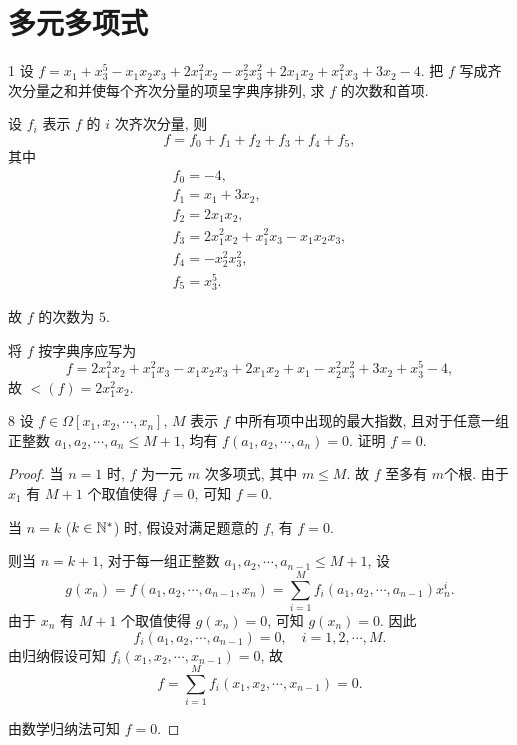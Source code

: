 
\renewcommand{\thesection}{1.9}

\section{多元多项式}\label{sec:1.9}

\begin{ex}{1}\label{ex:1.9.1}
    设 \(f=x_1+x_3^5-x_1x_2x_3+2x_1^2x_2-x_2^2x_3^2+2x_1x_2+x_1^2x_3+3x_2-4\).
    把 \(f\) 写成齐次分量之和并使每个齐次分量的项呈字典序排列, 求 \(f\) 的次数和首项.
\end{ex}

\begin{solution}
    设 \(f_i\) 表示 \(f\) 的 \(i\) 次齐次分量, 则
    \[
    f=f_0+f_1+f_2+f_3+f_4+f_5,
    \]
    其中
    \begin{gather*}
        f_0=-4,\\
        f_1=x_1+3x_2,\\
        f_2=2x_1x_2,\\
        f_3=2x_1^2x_2+x_1^2x_3-x_1x_2x_3,\\
        f_4=-x_2^2x_3^2,\\
        f_5=x_3^5.
    \end{gather*}

    故 \(f\) 的次数为 \(5\).

    将 \(f\) 按字典序应写为
    \[
    f=2x_1^2x_2+x_1^2x_3-x_1x_2x_3+2x_1x_2+x_1-x_2^2x_3^2+3x_2+x_3^5-4,
    \]
    故 \(\lt(f)=2x_1^2x_2\).
\end{solution}

\begin{ex}{8}\label{ex:1.9.8}
    设 \(f\in\Omega[x_1,x_2,\cdots,x_n]\), \(M\) 表示 \(f\) 中所有项中出现的最大指数,
    且对于任意一组正整数 \(a_1,a_2,\cdots,a_n\leq M+1\), 均有 \(f(a_1,a_2,\cdots,a_n)=0\).
    证明 \(f=0\).
\end{ex}

\begin{proof}
    当 \(n=1\) 时, \(f\) 为一元 \(m\) 次多项式, 其中 \(m\leq M\). 故 \(f\) 至多有 \(m\)个根.
    由于 \(x_1\) 有 \(M+1\) 个取值使得 \(f=0\), 可知 \(f=0\).

    当 \(n=k\) (\(k\in\mathbb{N}^*\)) 时, 假设对满足题意的 \(f\), 有 \(f=0\).
    
    则当 \(n=k+1\), 对于每一组正整数 \(a_1,a_2,\cdots,a_{n-1}\leq M+1\), 设
    \[
    g(x_n)=f(a_1,a_2,\cdots,a_{n-1},x_n)=\sum_{i=1}^{M}f_i(a_1,a_2,\cdots,a_{n-1})x_n^i.
    \]
    由于 \(x_n\) 有 \(M+1\) 个取值使得 \(g(x_n)=0\), 可知 \(g(x_n)=0\). 因此
    \[
    f_i(a_1,a_2,\cdots,a_{n-1})=0,\quad i=1,2,\cdots,M.
    \]
    由归纳假设可知 \(f_i(x_1,x_2,\cdots,x_{n-1})=0\), 故
    \[
    f=\sum_{i=1}^{M}f_i(x_1,x_2,\cdots,x_{n-1})=0.
    \]

    由数学归纳法可知 \(f=0\).
\end{proof}